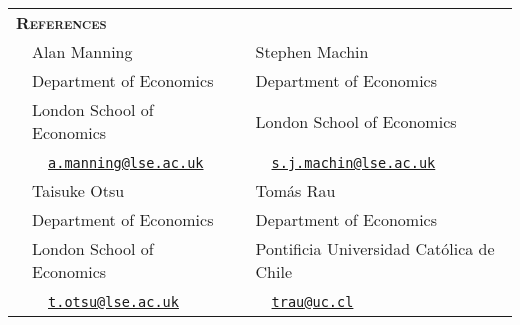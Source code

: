 \begin{tabular}{llll}

	\multicolumn{3}{l}{
		\large
		\textbf{%
			\textsc{%
				References
			}
		}
	}
	\\[2ex]
		
	\indent
	& Alan Manning
	& \hspace{4.5em}
	& Stephen Machin
	\\[.25ex]
	
	& Department of Economics
	&
	& Department of Economics
	\\[.25ex]
	
	& London School of Economics
	&
	& London School of Economics
	\\[.25ex]
	
	& \textcolor{stlavender}{\faEnvelopeO}~~\href{mailto:a.manning@lse.ac.uk}{\texttt{a.manning@lse.ac.uk}}
	&
	& \textcolor{stlavender}{\faEnvelopeO}~~\href{mailto:s.j.machin@lse.ac.uk}{\texttt{s.j.machin@lse.ac.uk}}
	\\[1.5em]
	
	& Taisuke Otsu
	&
	& Tom\'as Rau
	\\[.25ex]
	
	& Department of Economics
	&
	& Department of Economics
	\\[.25ex]
	
	& London School of Economics
	&
	& Pontificia Universidad Cat\'olica de Chile
	\\[.25ex]
	
	& \textcolor{stlavender}{\faEnvelopeO}~~\href{mailto:t.otsu@lse.ac.uk}{\texttt{t.otsu@lse.ac.uk}}
	&
	& \textcolor{stlavender}{\faEnvelopeO}~~\href{mailto:trau@uc.cl}{\texttt{trau@uc.cl}}
	
\end{tabular}